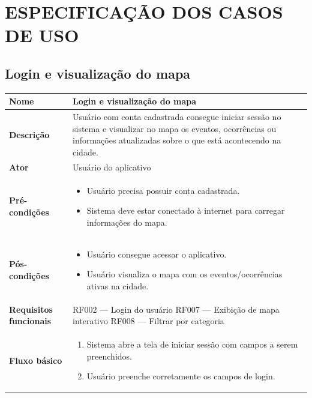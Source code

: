 
\section{ESPECIFICAÇÃO DOS CASOS DE USO}

\subsection{Login e visualização do mapa}

\begin{longtable}{|p{4cm}|p{10cm}|}
  \hline
  \textbf{Nome} & Login e visualização do mapa \\
  \hline
  \textbf{Descrição} & Usuário com conta cadastrada consegue iniciar sessão no sistema e visualizar no mapa os eventos, ocorrências ou informações atualizadas sobre o que está acontecendo na cidade. \\
  \hline
  \textbf{Ator} & Usuário do aplicativo \\
  \hline
  \textbf{Pré-condições} &
    \begin{itemize}
      \item Usuário precisa possuir conta cadastrada.
      \item Sistema deve estar conectado à internet para carregar informações do mapa.
    \end{itemize} \\
  \hline
  \textbf{Pós-condições} &
    \begin{itemize}
      \item Usuário consegue acessar o aplicativo.
      \item Usuário visualiza o mapa com os eventos/ocorrências ativas na cidade.
    \end{itemize} \\
  \hline
  \textbf{Requisitos funcionais} & RF002 — Login do usuário \newline RF007 — Exibição de mapa interativo \newline RF008 — Filtrar por categoria \\
  \hline
  \textbf{Fluxo básico} &
    \begin{enumerate}
      \item Sistema abre a tela de iniciar sessão com campos a serem preenchidos.
      \item Usuário preenche corretamente os campos de login.

\end{enumerate}
\end{longtable}
